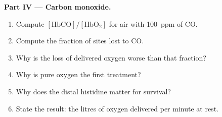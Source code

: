 \begin{problem}
\medskip\noindent\textbf{Part IV --- Carbon monoxide.}
\begin{enumerate}[resume]
  \item Compute $[\mathrm{HbCO}]/[\mathrm{HbO_2}]$ for air with \qty{100}{ppm} of CO.
  \item Compute the fraction of sites lost to CO.
  \item Why is the loss of delivered oxygen worse than that fraction?
  \item Why is pure oxygen the first treatment?
  \item Why does the distal histidine matter for survival?
  \item State the result: the litres of oxygen delivered per minute at rest.
\end{enumerate}
\end{problem}
